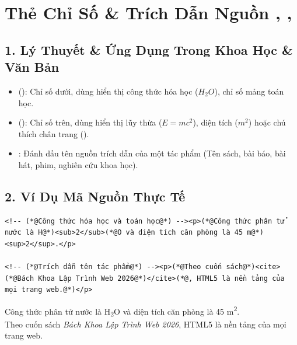 \section{Thẻ Chỉ Số \& Trích Dẫn Nguồn , , }
\subsection{1. Lý Thuyết \& Ứng Dụng Trong Khoa Học \& Văn Bản}
\begin{itemize}
    \item {} (): Chỉ số dưới, dùng hiển thị công thức hóa học ($H_2O$), chỉ số mảng toán học.
    \item {} (): Chỉ số trên, dùng hiển thị lũy thừa ($E=mc^2$), diện tích ($m^2$) hoặc chú thích chân trang ().
    \item {}: Đánh dấu tên nguồn trích dẫn của một tác phẩm (Tên sách, bài báo, bài hát, phim, nghiên cứu khoa học).
\end{itemize}

\subsection{2. Ví Dụ Mã Nguồn Thực Tế}
\begin{codeWindow}
\begin{lstlisting}[language=HTML5]
<!-- (*@Công thức hóa học và toán học@*) --><p>(*@Công thức phân tử nước là H@*)<sub>2</sub>(*@O và diện tích căn phòng là 45 m@*)<sup>2</sup>.</p>

<!-- (*@Trích dẫn tên tác phẩm@*) --><p>(*@Theo cuốn sách@*)<cite>(*@Bách Khoa Lập Trình Web 2026@*)</cite>(*@, HTML5 là nền tảng của mọi trang web.@*)</p>
\end{lstlisting}
\end{codeWindow}

\begin{browserWindow}
\sffamily\small
Công thức phân tử nước là H\textsubscript{2}O và diện tích căn phòng là 45 m\textsuperscript{2}.\\[4pt]
Theo cuốn sách \textit{Bách Khoa Lập Trình Web 2026}, HTML5 là nền tảng của mọi trang web.
\end{browserWindow}

